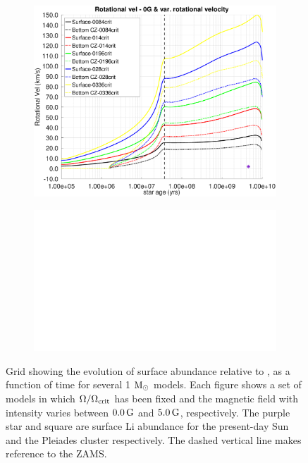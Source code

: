 \documentclass[fleqn,usenatbib]{mnras}
\begin{document}
\begin{figure}
\begin{subfigure}[h]{0.47\textwidth}
    \includegraphics[clip,width=\textwidth]{figures/paper1/rot_vel_var_vel_0_0g.eps}
    \label{fig:subim23}
    \end{subfigure}    
    \begin{subfigure}[h]{0.47\textwidth}
    \includegraphics[width=\textwidth]{figures/blank.eps}
    \label{fig:subim24}
    \end{subfigure}
\caption{Grid showing the evolution of surface  abundance relative to , as a function of time for several 1 $\mathrm{M}_\odot$ models. Each figure shows a set of models in which $\Omega / \Omega_{\mathrm{crit}}$ has been fixed and the magnetic field with intensity varies between $0.0\,\mathrm{G}$ and $5.0\,\mathrm{G}$, respectively. The purple star and square are surface Li abundance for the present-day Sun \citep{Asplund2009} and the Pleiades cluster \citep{Sestito2005} respectively. The dashed vertical line makes reference to the ZAMS.}
\label{fig:grid_li_var_g}
\end{figure}
\end{document}
